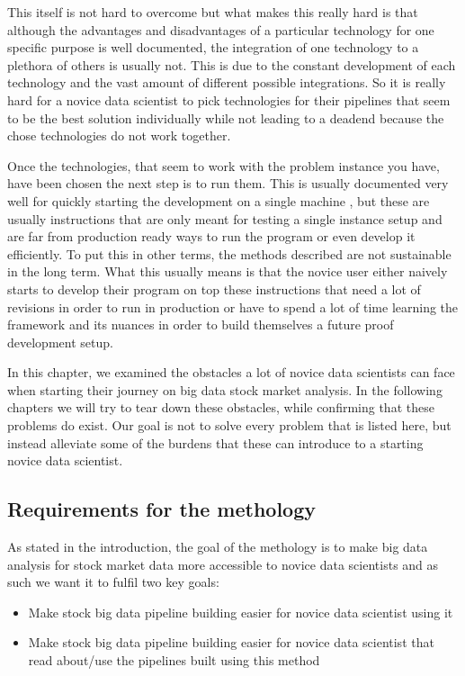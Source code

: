 This itself is not hard to overcome but what makes this really hard is that although the advantages and disadvantages of a particular technology for one specific purpose is well documented, the integration of one technology to a plethora of others is usually not.
This is due to the constant development of each technology and the vast amount of different possible integrations.
So it is really hard for a novice data scientist to pick technologies for their pipelines that seem to be the best solution individually while not leading to a deadend because the chose technologies do not work together.

Once the technologies, that seem to work with the problem instance you have, have been chosen the next step is to run them.
This is usually documented very well for quickly starting the development on a single machine \cite{kafka} \cite{flume}, but these are usually instructions that are only meant for testing a single instance setup and are far from production ready ways to run the program or even develop it efficiently.
To put this in other terms, the methods described are not sustainable in the long term.
What this usually means is that the novice user either naively starts to develop their program on top these instructions that need a lot of revisions in order to run in production or have to spend a lot of time learning the framework and its nuances in order to build themselves a future proof development setup.

In this chapter, we examined the obstacles a lot of novice data scientists can face when starting their journey on big data stock market analysis.
In the following chapters we will try to tear down these obstacles, while confirming that these problems do exist.
Our goal is not to solve every problem that is listed here, but instead alleviate some of the burdens that these can introduce to a starting novice data scientist.

\subsection{Requirements for the methology}

As stated in the introduction, the goal of the methology is to make big data analysis for stock market data more accessible to novice data scientists and as such we want it to fulfil two key goals:

\begin{itemize}
  \item Make stock big data pipeline building easier for novice data scientist using it
  \item Make stock big data pipeline building easier for novice data scientist that read about/use the pipelines built using this method
\end{itemize}

